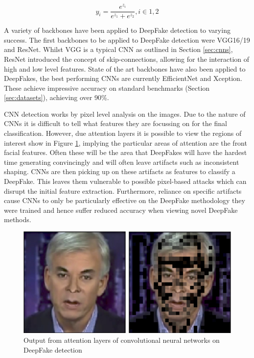 \begin{equation}
    \label{eq:softmax}
    y_i=\frac{e^{z_i}}{e^{z_1} + e^{z_2}}, i\in1,2
\end{equation}

A variety of backbones have been applied to DeepFake detection to varying success\cite{thing2023deepfake}. The first backbones to be applied to DeepFake detection were VGG16/19\cite{simonyan2014very} and ResNet\cite{he2016deep}. Whilst VGG is a typical CNN as outlined in Section \ref{sec:cnns}, ResNet introduced the concept of skip-connections, allowing for the interaction of high and low level features. State of the art backbones have also been applied to DeepFakes, the best performing CNNs are currently EfficientNet\cite{tan2019efficientnet} and Xception\cite{chollet2017xception}. These achieve impressive accuracy on standard benchmarks (Section \ref{sec:datasets}), achieving over 90\%.

CNN detection works by pixel level analysis on the images. Due to the nature of CNNs it is difficult to tell what features they are focussing on for the final classification. However, due attention layers it is possible to view the regions of interest show in Figure \ref{fig:attention}, implying the particular areas of attention are the front facial features. Often these will be the area that DeepFakes will have the hardest time generating convincingly and will often leave artifacts such as inconsistent shaping\cite{verdoliva2020media}. CNNs are then picking up on these artifacts as features to classify a DeepFake. This leaves them vulnerable to possible pixel-based attacks which can disrupt the initial feature extraction\cite{gandhi2020adversarial}. Furthermore, reliance on specific artifacts cause CNNs to only be particularly effective on the DeepFake methodology they were trained and hence suffer reduced accuracy when viewing novel DeepFake methods\cite{thing2023deepfake}.

\begin{figure}[h]
    \centering
    \includegraphics[width=0.5\linewidth]{dissertation//figures/attention-cnns.png}
    \caption{Output from attention layers of convolutional neural networks on DeepFake detection}
    \label{fig:attention}
\end{figure}

